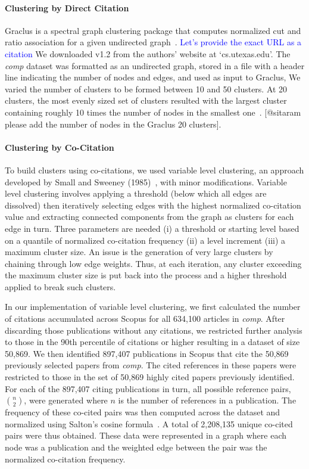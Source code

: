 \paragraph{Clustering by Direct Citation} Graclus is a spectral graph clustering package that computes normalized cut and ratio association for a given undirected graph~\cite{graclus_2007}. 
\textcolor{blue}{Let's provide the exact URL as a citation}
We downloaded v1.2 from the authors' website at `cs.utexas.edu'. 
The \emph{comp} dataset was formatted as an undirected graph, stored in a file with a header line indicating the number of nodes and edges, and used as input to Graclus,  We varied the number of clusters to be formed between 10 and 50 clusters. At 20 clusters, the most evenly sized set of clusters resulted with the largest cluster containing roughly 10 times the number of nodes in the smallest one~\cite{traag_louvain_2019}. [@sitaram please add the number of nodes in the Graclus 20 clusters]. 

\paragraph{Clustering by Co-Citation} To build clusters using co-citations, we used variable level clustering, an approach developed by Small and Sweeney (1985)~\cite{small_clustering_1985}, with minor modifications. Variable level clustering involves applying a threshold (below which all edges are dissolved) then iteratively selecting edges with the highest normalized co-citation value and extracting connected components from the graph as clusters for each edge in turn. Three parameters are needed (i) a threshold or starting level based on a quantile of normalized co-citation frequency (ii) a level increment (iii) a maximum cluster size. An issue is the generation of very large clusters by chaining through low edge weights.  Thus, at each iteration, any cluster exceeding the maximum cluster size is put back into the process and a higher threshold applied to break such clusters.

In our implementation of variable level clustering, we first calculated the number of citations accumulated across Scopus for all 634,100 articles in \emph{comp}. After discarding those publications without any citations, we restricted further analysis to those in the 90th percentile of citations or higher resulting in a dataset of size 50,869. We then identified 897,407 publications in Scopus that cite the 50,869 previously selected papers from \emph{comp}. The cited references in these papers were restricted to those in the set of 50,869 highly cited papers previously identified. For each of the 897,407 citing publications in turn, all possible reference pairs, ${n \choose 2}$, were generated where $n$ is the number of references in a publication. The frequency of these co-cited pairs was then computed across the dataset  and normalized using Salton's cosine formula~\cite{salton_citation_1979}. A total of 2,208,135 unique co-cited pairs were thus obtained. These data were represented in a graph where each node was a publication and the weighted edge between the pair was the normalized co-citation frequency. \par

